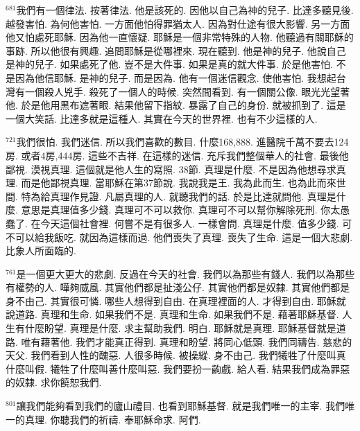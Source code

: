 \documentclass{book}
\begin{document}
$^{681}$我們有一個律法.
按著律法.
他是該死的.
因他以自己為神的兒子.
比達多聽見後.
越發害怕.
為何他害怕.
一方面他怕得罪猶太人.
因為對仕途有很大影響.
另一方面他又怕處死耶穌.
因為他一直懷疑.
耶穌是一個非常特殊的人物.
他聽過有關耶穌的事跡.
所以他很有興趣.
追問耶穌是從哪裡來.
現在聽到.
他是神的兒子.
他說自己是神的兒子.
如果處死了他.
豈不是大件事.
如果是真的就大件事.
於是他害怕.
不是因為他信耶穌.
是神的兒子.
而是因為.
他有一個迷信觀念.
使他害怕.
我想起台灣有一個殺人兇手.
殺死了一個人的時候.
突然間看到.
有一個關公像.
眼光光望著他.
於是他用黑布遮著眼.
結果他留下指紋.
暴露了自己的身份.
就被抓到了.
這是一個大笑話.
比達多就是這種人.
其實在今天的世界裡.
也有不少這樣的人.

$^{721}$我們很怕.
我們迷信.
所以我們喜歡的數目.
什麼168,888.
進醫院千萬不要去124房.
或者4房,444房.
這些不吉祥.
在這樣的迷信.
充斥我們整個華人的社會.
最後他鄙視.
漠視真理.
這個就是他人生的寫照.
38節.
真理是什麼.
不是因為他想尋求真理.
而是他鄙視真理.
當耶穌在第37節說.
我說我是王.
我為此而生.
也為此而來世間.
特為給真理作見證.
凡屬真理的人.
就聽我們的話.
於是比達就問他.
真理是什麼.
意思是真理值多少錢.
真理可不可以救你.
真理可不可以幫你解除死刑.
你太愚蠢了.
在今天這個社會裡.
何嘗不是有很多人.
一樣會問.
真理是什麼.
值多少錢.
可不可以給我飯吃.
就因為這樣而過.
他們喪失了真理.
喪失了生命.
這是一個大悲劇.
比象人所面臨的.

$^{761}$是一個更大更大的悲劇.
反過在今天的社會.
我們以為那些有錢人.
我們以為那些有權勢的人.
嘩夠威風.
其實他們都是扯淺公仔.
其實他們都是奴隸.
其實他們都是身不由己.
其實很可憐.
哪些人想得到自由.
在真理裡面的人.
才得到自由.
耶穌就說道路.
真理和生命.
如果我們不是.
真理和生命.
如果我們不是.
藉著耶穌基督.
人生有什麼盼望.
真理是什麼.
求主幫助我們.
明白.
耶穌就是真理.
耶穌基督就是道路.
唯有藉著他.
我們才能真正得到.
真理和盼望.
將同心低頭.
我們同禱告.
慈悲的天父.
我們看到人性的醜惡.
人很多時候.
被操縱.
身不由己.
我們犧牲了什麼叫真什麼叫假.
犧牲了什麼叫善什麼叫惡.
我們要扮一齣戲.
給人看.
結果我們成為罪惡的奴隸.
求你饒恕我們.

$^{801}$讓我們能夠看到我們的廬山禮目.
也看到耶穌基督.
就是我們唯一的主宰.
我們唯一的真理.
你聽我們的祈禱.
奉耶穌命求.
阿們.
\newpage
\end{document}
